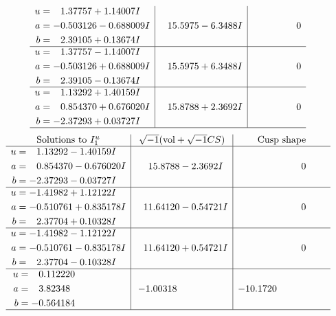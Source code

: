 \documentclass[1p]{elsarticle_modified}
\theoremstyle{definition}
\newcommand{\I}{\sqrt{-1}}
\begin{document}
$$\begin{array}{c|c|c}
\begin{aligned}
u &= \phantom{-}1.37757 + 1.14007 I \\
a &= -0.503126 - 0.688009 I \\
b &= \phantom{-}2.39105 + 0.13674 I\end{aligned}
 & \phantom{-}15.5975 - 6.3488 I & \phantom{-0.000000 } 0 \\ \hline\begin{aligned}
u &= \phantom{-}1.37757 - 1.14007 I \\
a &= -0.503126 + 0.688009 I \\
b &= \phantom{-}2.39105 - 0.13674 I\end{aligned}
 & \phantom{-}15.5975 + 6.3488 I & \phantom{-0.000000 } 0 \\ \hline\begin{aligned}
u &= \phantom{-}1.13292 + 1.40159 I \\
a &= \phantom{-}0.854370 + 0.676020 I \\
b &= -2.37293 + 0.03727 I\end{aligned}
 & \phantom{-}15.8788 + 2.3692 I & \phantom{-0.000000 } 0\\
 \hline 
 \end{array}$$\newpage$$\begin{array}{c|c|c}  
\text{Solutions to }I^u_{1}& \I (\text{vol} + \sqrt{-1}CS) & \text{Cusp shape}\\
 \hline 
\begin{aligned}
u &= \phantom{-}1.13292 - 1.40159 I \\
a &= \phantom{-}0.854370 - 0.676020 I \\
b &= -2.37293 - 0.03727 I\end{aligned}
 & \phantom{-}15.8788 - 2.3692 I & \phantom{-0.000000 } 0 \\ \hline\begin{aligned}
u &= -1.41982 + 1.12122 I \\
a &= -0.510761 + 0.835178 I \\
b &= \phantom{-}2.37704 + 0.10328 I\end{aligned}
 & \phantom{-}11.64120 - 0.54721 I & \phantom{-0.000000 } 0 \\ \hline\begin{aligned}
u &= -1.41982 - 1.12122 I \\
a &= -0.510761 - 0.835178 I \\
b &= \phantom{-}2.37704 - 0.10328 I\end{aligned}
 & \phantom{-}11.64120 + 0.54721 I & \phantom{-0.000000 } 0 \\ \hline\begin{aligned}
u &= \phantom{-}0.112220\phantom{ +0.000000I} \\
a &= \phantom{-}3.82348\phantom{ +0.000000I} \\
b &= -0.564184\phantom{ +0.000000I}\end{aligned}
 & -1.00318\phantom{ +0.000000I} & -10.1720\phantom{ +0.000000I}\\
 \hline 
 \end{array}$$\newpage\newpage\renewcommand{\arraystretch}{1}
\end{document}
